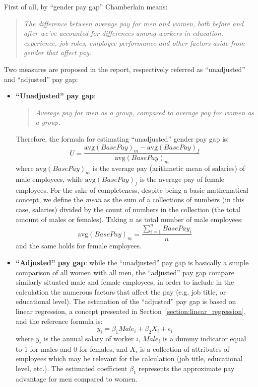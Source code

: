 First of all, by ``gender pay gap'' Chamberlain means:
\begin{quote}\emph{The difference between average pay for men and women, both before and after we've accounted for differences among workers in education, experience, job roles, employee performance and other factors aside from gender that affect pay.} \cite[p.~3]{chamberlain2017analyze}\end{quote}
Two measures are proposed in the report, respectively referred as ``unadjusted'' and ``adjusted'' pay gap:
\begin{itemize}
\item \textbf{``Unadjusted'' pay gap}:
\begin{quote}\emph{Average pay for men as a group, compared to average pay for women as a group.} \cite[p.~3]{chamberlain2017analyze}\end{quote}
Therefore, the formula for estimating ``unadjusted'' gender pay gap is: \[U = \frac{\mathrm{avg}(BasePay)_m - \mathrm{avg}(BasePay)_f}{\mathrm{avg}(BasePay)_m}\] where \(\mathrm{avg}(BasePay)_m\) is the average pay (arithmetic mean of salaries) of male employees, while \(\mathrm{avg}(BasePay)_f\) is the average pay of female employees.
For the sake of completeness, despite being a basic mathematical concept, we define the \textit{mean} as the sum of a collections of numbers (in this case, salaries) divided by the count of numbers in the collection (the total amount of males or females). Taking \(n\) as total number of male employees: \[\mathrm{avg}(BasePay)_m = \frac{\sum\limits_{i=1}^n BasePay_i}{n}\] and the same holds for female employees.
\item \textbf{``Adjusted'' pay gap}: while the ``unadjusted'' pay gap is basically a simple comparison of all women with all men, the ``adjusted'' pay gap compare similarly situated male and female employees, in order to include in the calculation the numerous factors that affect the pay (e.g. job title, or educational level). The estimation of the ``adjusted'' pay gap is based on linear regression, a concept presented in Section~\ref{section:linear_regression}, and the reference formula is: \[y_i = \beta_1\textit{Male}_i + \beta_2X_i + \epsilon_i\] where \(y_i\) is the annual salary of worker \(i\), \(\textit{Male}_i\) is a dummy indicator equal to 1 for males and 0 for females, and \(X_i\) is a collection of attributes of employees which may be relevant for the calculation (job title, educational level, etc.). The estimated coefficient \(\beta_1\) represents the approximate pay advantage for men compared to women.
\end{itemize}


